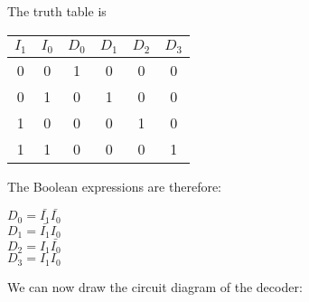 \documentclass[]{article}
\begin{document}
The truth table is

\begin{center}
	\begin{tabular}{|c|c||c|c|c|c|}
		$I_1$ & $I_0$ & $D_0$ & $D_1$ & $D_2$ & $D_3$ 	\\\hline
		  0   &   0   &   1   &   0   &   0   &   0  	\\
		  0   &   1   &   0   &   1   &   0   &   0  	\\
		  1   &   0   &   0   &   0   &   1   &   0  	\\
		  1   &   1   &   0   &   0   &   0   &   1  	\\
	\end{tabular}
	\bigbreak
\end{center}

The Boolean expressions are therefore:
\begin{center}
	$D_0 = \bar{I_1}\bar{I_0}$\\
	$D_1 = \bar{I_1}I_0$\\
	$D_2 = I_1\bar{I_0}$\\
	$D_3 = I_1I_0$
\end{center}

We can now draw the circuit diagram of the decoder:
\end{document}
